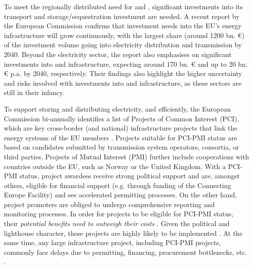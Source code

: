 \documentclass[preprint,12pt,sort&compress]{elsarticle}
\begin{document}

To meet the regionally distributed need for  and , significant investments into its transport and storage/sequestration investment are needed. A recent report by the European Commission \cite{europeancommission.directorategeneralforenergy.InvestmentNeedsEuropean2025} confirms that investment needs into the EU's energy infrastructure will grow continuously, with the largest share (around 1200 bn. \euro{}) of the investment volume going into electricity distribution and transmission by 2040. Beyond the electricity sector, the report also emphasises on significant investments into  and  infrastructure, expecting around 170 bn. \euro{} and up to 20 bn. \euro{} p.a. by 2040, respectively. Their findings also highlight the higher uncertainty and risks involved with investments into  and  infrastructure, as these sectors are still in their infancy.

To support storing and distributing electricity,  and  efficiently, the European Commission bi-annually identifies a list of Projects of Common Interest (PCI), which are key cross-border (and national) infrastructure projects that link the energy systems of the EU members \cite{europeancommissionCommissionDelegatedRegulation2023}. Projects suitable for PCI-PMI status are based on candidates submitted by transmission system operators, consortia, or third parties. Projects of Mutual Interest (PMI) further include cooperations with countries outside the EU, such as Norway or the United Kingdom. With a PCI-PMI status, project awardees receive strong political support and are, amongst others, eligible for financial support (e.g. through funding of the Connecting Europe Facility) and see accelerated permitting processes. On the other hand, project promoters are obliged to undergo comprehensive reporting and monitoring processes. 
In order for projects to be eligible for PCI-PMI status, their \textit{potential benefits need to outweigh their costs} \cite{europeancommissionCommissionDelegatedRegulation2023}. Given the political and lighthouse character, these projects are highly likely to be implemented \cite{europeancommission.directorategeneralforenergy.InvestmentNeedsEuropean2025}. At the same time, any large infrastructure project, including PCI-PMI projects, commonly face delays due to permitting, financing, procurement bottlenecks, etc. \cite
{acerConsolidatedReportProgress2023}. 

\newpage
\end{document}

